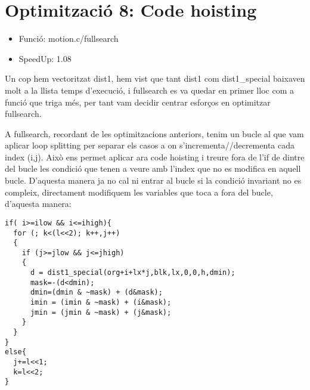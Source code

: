 \section{Optimitzaci\'o 8: Code hoisting}
\begin{itemize}
\item{Funció: motion.c/fullsearch}
\item{SpeedUp: 1.08}
\end{itemize}

Un cop hem vectoritzat dist1, hem vist que tant dist1 com dist1\_special baixaven molt a la llista temps d'execució, i fullsearch es va quedar en primer lloc com a funció que triga més, per tant vam decidir centrar esforços en optimitzar fullsearch.

A fullsearch, recordant de les optimitzacions anteriors, tenim un bucle al que vam aplicar loop splitting per separar els casos a on s'incrementa//decrementa cada index (i,j). Això ens permet aplicar ara code hoisting i treure fora de l'if de dintre del bucle les condició que tenen a veure amb l'index que no es modifica en aquell bucle. D'aquesta manera ja no cal ni entrar al bucle si la condició invariant no es compleix, directament modifiquem les variables que toca a fora del bucle, d'aquesta manera:

\begin{lstlisting}
if( i>=ilow && i<=ihigh){
  for (; k<(l<<2); k++,j++)
  {
    if (j>=jlow && j<=jhigh)
    {
      d = dist1_special(org+i+lx*j,blk,lx,0,0,h,dmin);
      mask=-(d<dmin);
      dmin=(dmin & ~mask) + (d&mask);
      imin = (imin & ~mask) + (i&mask);
      jmin = (jmin & ~mask) + (j&mask);
    }
  } 
}
else{
  j+=l<<1;
  k=l<<2;	
}	 	
\end{lstlisting}
